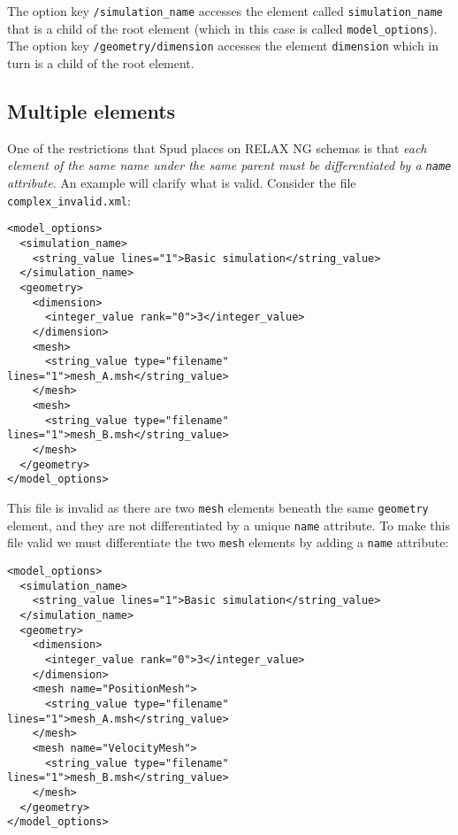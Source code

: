 \documentclass[a4paper, 11pt]{book}
\begin{document}
The option key \verb+/simulation_name+ accesses the element
called \verb+simulation_name+ that is a child of the root element
(which in this case is called \verb+model_options+). The option key
\verb+/geometry/dimension+ accesses the element \verb+dimension+ which
in turn is a child of the root element.

\subsection{Multiple elements}
One of the restrictions that Spud places on RELAX NG schemas
is that \emph{each element of the same name under the same parent
must be differentiated by a \texttt{name} attribute}. An example will
clarify what is valid. Consider the file \verb+complex_invalid.xml+:
\begin{verbatim}
<model_options>
  <simulation_name>
    <string_value lines="1">Basic simulation</string_value>
  </simulation_name>
  <geometry>
    <dimension>
      <integer_value rank="0">3</integer_value>
    </dimension>
    <mesh>
      <string_value type="filename" lines="1">mesh_A.msh</string_value>
    </mesh>
    <mesh>
      <string_value type="filename" lines="1">mesh_B.msh</string_value>
    </mesh>
  </geometry>
</model_options>                                                                                                                                                                                               
\end{verbatim}

This file is invalid as there are two \verb+mesh+ elements beneath the same
\verb+geometry+ element, and they are not differentiated by a unique \verb+name+
attribute. To make this file valid we must differentiate the two \verb+mesh+
elements by adding a \verb+name+ attribute:

\begin{verbatim}
<model_options>
  <simulation_name>
    <string_value lines="1">Basic simulation</string_value>
  </simulation_name>
  <geometry>
    <dimension>
      <integer_value rank="0">3</integer_value>
    </dimension>
    <mesh name="PositionMesh">
      <string_value type="filename" lines="1">mesh_A.msh</string_value>
    </mesh>
    <mesh name="VelocityMesh">
      <string_value type="filename" lines="1">mesh_B.msh</string_value>
    </mesh>
  </geometry>
</model_options>                                                                                                                                                                                               
\end{verbatim}
\end{document}
